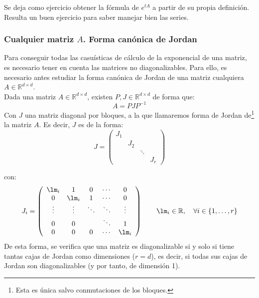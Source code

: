 \begin{ejercicio*}
    Se deja como ejercicio obtener la fórmula de $e^{tA}$ a partir de su propia definición. Resulta un buen ejercicio para saber manejar bien las series.
\end{ejercicio*}

\subsubsection{Cualquier matriz $A$. Forma canónica de Jordan}
Para conseguir todas las casuísticas de cálculo de la exponencial de una matriz, es necesario tener en cuenta las matrices no diagonalizables. Para ello, es necesario antes estudiar la forma canónica de Jordan de una matriz cualquiera $A\in \mathbb{R}^{d\times d}$.\\

\noindent
Dada una matriz $A\in \mathbb{R}^{d\times d}$, existen $P,J\in \mathbb{R}^{d\times d}$ de forma que:
\begin{equation*}
    A = PJP^{-1}
\end{equation*}
Con $J$ una matriz diagonal por bloques, a la que llamaremos forma de Jordan de\footnote{Esta es única salvo conmutaciones de los bloques.} la matriz $A$. Es decir, $J$ es de la forma:
\begin{equation*}
    J = \left(\begin{array}{cccc}
         J_1 &  &  & \\
         & J_2 &   & \\
         &  & \ddots &  \\
         &  &  &  J_r
    \end{array}\right)
\end{equation*}

con:
\begin{equation*}
    J_i = \left(\begin{array}{ccccc}
            \lm_i & 1 & 0 & \cdots & 0 \\
            0 & \lm_i & 1 & \cdots & 0 \\
         \vdots & \vdots & \ddots & \ddots & \vdots \\
        0& 0 &   &\ddots & 1 \\
        0& 0 & 0 &\cdots & \lm_i 
    \end{array}\right) \qquad \lm_i \in \mathbb{R}, \quad \forall i \in \{1,\ldots,r\}
\end{equation*}
De esta forma, se verifica que una matriz es diagonalizable si y solo si tiene tantas cajas de Jordan como dimensiones ($r=d$), es decir, si todas sus cajas de Jordan son diagonalizables (y por tanto, de dimensión 1). 

